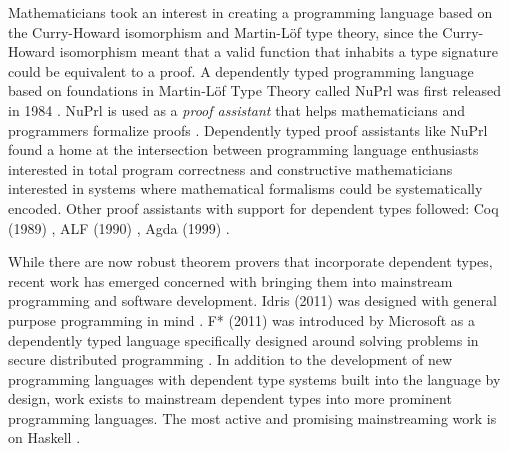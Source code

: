 Mathematicians took an interest in creating a programming language based on the
Curry-Howard isomorphism and Martin-L\"{o}f type theory, since the Curry-Howard
isomorphism meant that a valid function that inhabits a type signature could be
equivalent to a proof. A dependently typed programming language based on
foundations in Martin-L\"{o}f Type Theory called NuPrl was first released in
1984 \cite{nuprl}. NuPrl is used as a \textit{proof assistant} that helps
mathematicians and programmers formalize proofs \cite{nuprl}. Dependently typed
proof assistants like NuPrl found a home at the intersection between programming
language enthusiasts interested in total program correctness and constructive
mathematicians interested in systems where mathematical formalisms could be
systematically encoded. Other proof assistants with support for dependent types
followed: Coq (1989) \cite{coquand1988calculus}, ALF (1990) \cite{alf}, Agda
(1999) \cite{norell:thesis}.

While there are now robust theorem provers that incorporate dependent types,
recent work has emerged concerned with bringing them into mainstream programming
and software development. Idris (2011) was designed with general purpose
programming in mind \cite{tdd_book}. F* (2011) was introduced by Microsoft as a
dependently typed language specifically designed around solving problems in
secure distributed programming \cite{fstar_distributed_programming}. In addition
to the development of new programming languages with dependent type systems
built into the language by design, work exists to mainstream dependent types
into more prominent programming languages. The most active and promising
mainstreaming work is on Haskell \cite{eisenberg2016,gundry2013}. 